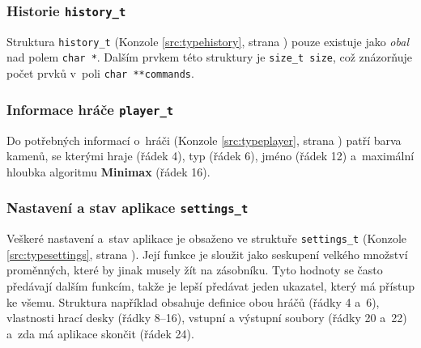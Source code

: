 \subsubsection{Historie \lstinline{history_t}} \label{sec:typehistory}

Struktura \lstinline{history_t} (Konzole \ref{src:typehistory}, strana \pageref{src:typehistory}) pouze existuje jako \emph{obal} nad polem \lstinline[style=source]{char *}. Dalším prvkem této struktury je \lstinline[style=source]{size_t size}, což znázorňuje počet prvků v~poli \lstinline[style=source]{char **commands}.



\subsubsection{Informace hráče \lstinline{player_t}}

Do potřebných informací o~hráči (Konzole \ref{src:typeplayer}, strana \pageref{src:typeplayer}) patří barva kamenů, se kterými hraje (řádek 4), typ (řádek 6), jméno (řádek 12) a~maximální hloubka algoritmu \textbf{Minimax} (řádek 16).



\subsubsection{Nastavení a stav aplikace \lstinline{settings_t}}

Veškeré nastavení a~stav aplikace je obsaženo ve struktuře \lstinline{settings_t} (Konzole \ref{src:typesettings}, strana \pageref{src:typesettings}). Její funkce je sloužit jako seskupení velkého množství proměnných, které by jinak musely žít na zásobníku. Tyto hodnoty se často předávají dalším funkcím, takže je lepší předávat jeden ukazatel, který má přístup ke všemu. Struktura například obsahuje definice obou hráčů (řádky 4 a~6), vlastnosti hrací desky (řádky 8--16), vstupní a výstupní soubory (řádky 20 a~22) a~zda má aplikace skončit (řádek 24).

\newpage



